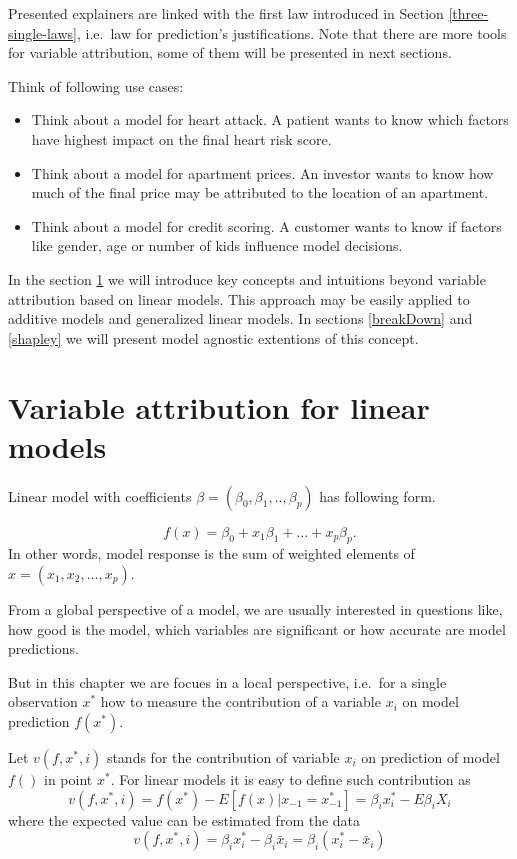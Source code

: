 \documentclass[]{book}
\providecommand{\tightlist}{%
  \setlength{\itemsep}{0pt}\setlength{\parskip}{0pt}}
\theoremstyle{definition}
\theoremstyle{definition}
\theoremstyle{definition}
\theoremstyle{remark}
\begin{document}
Presented explainers are linked with the first law introduced in Section
\ref{three-single-laws}, i.e.~law for prediction's justifications. Note
that there are more tools for variable attribution, some of them will be
presented in next sections.

Think of following use cases:

\begin{itemize}
\tightlist
\item
  Think about a model for heart attack. A patient wants to know which
  factors have highest impact on the final heart risk score.
\item
  Think about a model for apartment prices. An investor wants to know
  how much of the final price may be attributed to the location of an
  apartment.
\item
  Think about a model for credit scoring. A customer wants to know if
  factors like gender, age or number of kids influence model decisions.
\end{itemize}

In the section \ref{VAlinMod} we will introduce key concepts and
intuitions beyond variable attribution based on linear models. This
approach may be easily applied to additive models and generalized linear
models. In sections \ref{breakDown} and \ref{shapley} we will present
model agnostic extentions of this concept.

\hypertarget{VAlinMod}{%
\section{Variable attribution for linear models}\label{VAlinMod}}

Linear model with coefficients
\(\beta = (\beta_0, \beta_1, .., \beta_p)\) has following form.

\[
f(x) = \beta_0 + x_1 \beta_1 + \ldots + x_p \beta_p.
\] In other words, model response is the sum of weighted elements of
\(x = (x_1, x_2, \ldots, x_p)\).

From a global perspective of a model, we are usually interested in
questions like, how good is the model, which variables are significant
or how accurate are model predictions.

But in this chapter we are focues in a local perspective, i.e.~for a
single observation \(x^*\) how to measure the contribution of a variable
\(x_i\) on model prediction \(f(x^*)\).

Let \(v(f, x^*, i)\) stands for the contribution of variable \(x_i\) on
prediction of model \(f()\) in point \(x^*\). For linear models it is
easy to define such contribution as \[
v(f, x^*, i) = f(x^*) - E[f(x)|x_{-1} = x^*_{-1}] = \beta_i x^*_i  - E \beta_i X_i
\] where the expected value can be estimated from the data \[
v(f, x^*, i) = \beta_i x^*_i - \beta_i \bar x_i = \beta_i (x^*_i - \bar x_i)
\]
\end{document}
